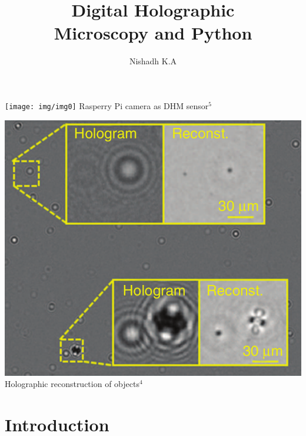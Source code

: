 \documentclass[a0paper,fleqn]{betterposter}
\begin{document}
{{\begin{center}
	\noindent\begin{minipage}[b]{.5\textwidth}
		\texttt{[image: img/img0]}
		\newline
		\LARGE Rasperry Pi camera as DHM sensor$^{\text{5}}$
	\end{minipage}%
	\hfill
	\begin{minipage}[b]{.5\linewidth}
		\includegraphics[width=0.7\linewidth, height=0.2\textheight]{img/img1}
		\newline
		\LARGE Holographic reconstruction of objects$^{\text{4}}$
	\end{minipage}

\end{center}
}{


}

}{

\title{Digital Holographic \\ Microscopy and Python }
\author{Nishadh K.A}

\section{Introduction}


}
\end{document}
